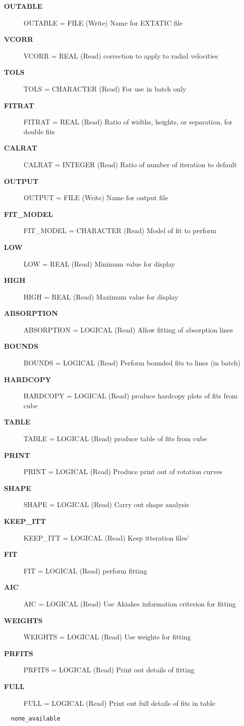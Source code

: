 \begin{description}
\begin{description}
\item [{\bf OUTABLE}]
    OUTABLE = FILE (Write)
        Name for EXTATIC file
\item [{\bf VCORR}]
    VCORR = REAL (Read)
        correction to apply to radial velocities
\item [{\bf TOLS}]
    TOLS = CHARACTER (Read)
        For use in batch only
\item [{\bf FITRAT}]
    FITRAT = REAL (Read)
        Ratio of widths, heights, or separation, for double fits
\item [{\bf CALRAT}]
    CALRAT = INTEGER (Read)
        Ratio of number of iteration to default
\item [{\bf OUTPUT}]
    OUTPUT = FILE (Write)
        Name for output file
\item [{\bf FIT_MODEL}]
    FIT_MODEL = CHARACTER (Read)
        Model of fit to perform
\item [{\bf LOW}]
    LOW = REAL (Read)
        Minimum value for display
\item [{\bf HIGH}]
    HIGH = REAL (Read)
        Maximum value for display
\item [{\bf ABSORPTION}]
    ABSORPTION = LOGICAL (Read)
        Allow fitting of absorption lines
\item [{\bf BOUNDS}]
    BOUNDS = LOGICAL (Read)
        Perform bounded fits to lines (in batch)
\item [{\bf HARDCOPY}]
    HARDCOPY = LOGICAL (Read)
        produce hardcopy plots of fits from cube
\item [{\bf TABLE}]
    TABLE = LOGICAL (Read)
        produce table of fits from cube
\item [{\bf PRINT}]
    PRINT = LOGICAL (Read)
        Produce print out of rotation curves
\item [{\bf SHAPE}]
    SHAPE = LOGICAL (Read)
        Carry out shape analysis
\item [{\bf KEEP_ITT}]
    KEEP_ITT = LOGICAL (Read)
        Keep itteration files'
\item [{\bf FIT}]
    FIT = LOGICAL (Read)
        perform fitting
\item [{\bf AIC}]
    AIC = LOGICAL (Read)
        Use Akiakes information criterion for fitting
\item [{\bf WEIGHTS}]
    WEIGHTS = LOGICAL (Read)
        Use weights for fitting
\item [{\bf PRFITS}]
    PRFITS = LOGICAL (Read)
        Print out details of fitting
\item [{\bf FULL}]
    FULL = LOGICAL (Read)
        Print out full details of fits in table
\end{description}

\item [{\bf Source comments:}]
\begin{verbatim}
  none_available

\end{verbatim}
\end{description}
